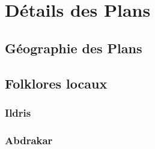 \chapter{Détails des Plans}
\section{Géographie des Plans}
\section{Folklores locaux}
\subsection{Ildris}
\subsection{Abdrakar}